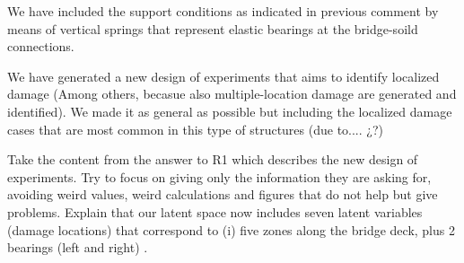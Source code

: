 \documentclass[11pt]{article}
\begin{document}
We have included the support conditions as indicated in previous comment by means of vertical springs that represent elastic bearings at the bridge-soild connections. 

We have generated a new design of experiments that aims to identify localized damage (Among others, becasue also multiple-location damage are generated and identified). We made it as general as possible but including the localized damage cases that are most common in this type of structures (due to.... ¿?)

Take the content from the answer to R1 which describes the new design of experiments. Try to focus on giving only the information they are asking for, avoiding weird values, weird calculations and figures that do not help but give problems. 
Explain that our latent space now includes seven latent variables (damage locations) that correspond to (i) five zones along the bridge deck, plus 2 bearings (left and right) . 
\end{document}
